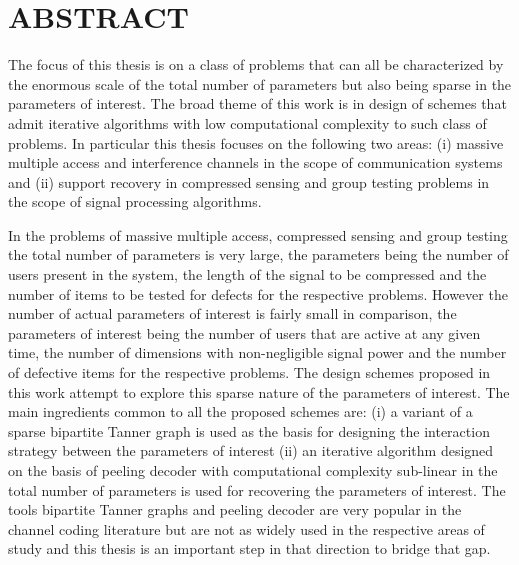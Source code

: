 %
%
%
%

\chapter*{ABSTRACT}

\pagestyle{plain} %
\setcounter{page}{2}

\indent The focus of this thesis is on a class of problems that can all be characterized by the enormous scale of the total number of parameters but also being sparse in the parameters of interest. The broad theme of this work is in design of schemes that admit iterative algorithms with low computational complexity to such class of problems. In particular this thesis focuses on the following two areas: (i) massive multiple access and interference channels in the scope of communication systems and (ii) support recovery in compressed sensing and group testing problems in the scope of signal processing algorithms. 

In the problems of massive multiple access, compressed sensing and group testing the total number of parameters is very large, the parameters being the number of users present in the system, the length of the signal to be compressed and the number of items to be tested for defects for the respective problems. However the number of actual parameters of interest is fairly small in comparison, the parameters of interest being the number of users that are active at any given time, the number of dimensions with non-negligible signal power and the number of defective items for the respective problems. The design schemes proposed in this work attempt to explore this sparse nature of the parameters of interest. The main ingredients common to all the proposed schemes are: (i) a variant of a sparse bipartite Tanner graph is used as the basis for designing the interaction strategy between the parameters of interest (ii) an iterative algorithm designed on the basis of peeling decoder with computational complexity sub-linear in the total number of parameters is used for recovering the parameters of interest. The tools bipartite Tanner graphs and peeling decoder are very popular in the channel coding literature \cite{richardson2008modern} but are not as widely used in the respective areas of study and this thesis is an important step in that direction to bridge that gap.

